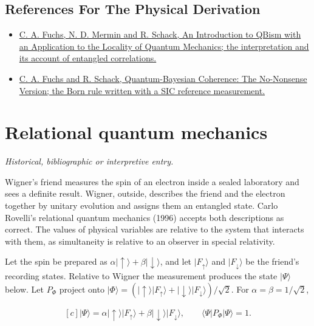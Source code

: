 \documentclass[11pt,oneside]{book}
\newenvironment{centeredalign}{\[\begin{gathered}[c]}{\end{gathered}\]}
\newcommand{\ket}[1]{\lvert #1\rangle}
\begin{document}
\subsection*{References For The Physical Derivation}
\begin{itemize}
\item \href{https://arxiv.org/abs/1311.5253}{C. A. Fuchs, N. D. Mermin and R. Schack, An Introduction to QBism with an Application to the Locality of Quantum Mechanics; the interpretation and its account of entangled correlations.}
\item \href{https://arxiv.org/abs/1301.3274}{C. A. Fuchs and R. Schack, Quantum-Bayesian Coherence: The No-Nonsense Version; the Born rule written with a SIC reference measurement.}
\end{itemize}





\clearpage

\section{Relational quantum mechanics}

\label{topic:relational-quantum-mechanics}

\par\smallskip\noindent\textit{Historical, bibliographic or interpretive entry.}

Wigner's friend measures the spin of an electron inside a sealed laboratory and sees a definite result. Wigner, outside, describes the friend and the electron together by unitary evolution and assigns them an entangled state. Carlo Rovelli's relational quantum mechanics (1996) accepts both descriptions as correct. The values of physical variables are relative to the system that interacts with them, as simultaneity is relative to an observer in special relativity.

Let the spin be prepared as \(\alpha\ket{\uparrow}+\beta\ket{\downarrow}\), and let \(\ket{F_\uparrow}\) and \(\ket{F_\downarrow}\) be the friend's recording states. Relative to Wigner the measurement produces the state \(\ket{\Psi}\) below. Let \(P_\Phi\) project onto \(\ket{\Phi}=(\ket{\uparrow}\ket{F_\uparrow}+\ket{\downarrow}\ket{F_\downarrow})/\sqrt2\). For \(\alpha=\beta=1/\sqrt2\),

\begin{centeredalign}
\ket{\Psi}=\alpha\ket{\uparrow}\ket{F_\uparrow}+\beta\ket{\downarrow}\ket{F_\downarrow},\qquad
\langle\Psi|P_\Phi|\Psi\rangle=1 .
\end{centeredalign}
\end{document}
